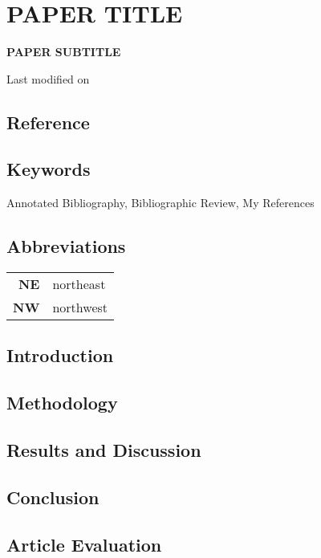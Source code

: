 \chapter{PAPER TITLE}
\vspace{-8mm}
{\Large \textbf{PAPER SUBTITLE}}
\vspace{8mm}

\begin{flushright}
Last modified on \filemodprintdate{\jobname}
\end{flushright}

\section*{Reference}

\section*{Keywords}
Annotated Bibliography, Bibliographic Review, My References

\section*{Abbreviations}
\begin{table}[ht!]
\begin{tabular}{r l}
\textbf{NE}	& northeast		\\
\textbf{NW}	& northwest
\end{tabular}
\end{table}

\section{Introduction}
\blindtext

\section{Methodology}
\blindtext

\section{Results and Discussion}
\blindtext

\section{Conclusion}
\blindtext

\section*{Article Evaluation}
\blindtext